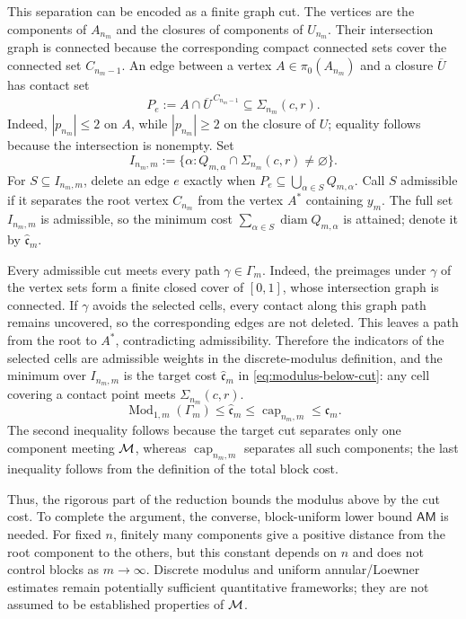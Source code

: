 This separation can be encoded as a finite graph cut. The vertices are
the components of \(A_{n_m}\) and the closures of components of
\(U_{n_m}\). Their intersection graph is connected because the
corresponding compact connected sets cover the connected set
\(C_{n_m-1}\). An edge between a vertex \(A\in\pi_0(A_{n_m})\) and a
closure \(\overline U\) has contact set
\[
 P_e:=A\cap\overline U^{\,C_{n_m-1}}\subseteq\Sigma_{n_m}(c,r).
\]
Indeed, \(|p_{n_m}|\le2\) on \(A\), while \(|p_{n_m}|\ge2\) on the
closure of \(U\); equality follows because the intersection is
nonempty. Set
\[
 I_{n_m,m}:=\{\alpha:Q_{m,\alpha}\cap\Sigma_{n_m}(c,r)\ne\varnothing\}.
\]
For \(S\subseteq I_{n_m,m}\), delete an edge \(e\) exactly when
\(P_e\subseteq\bigcup_{\alpha\in S}Q_{m,\alpha}\). Call \(S\)
admissible if it separates the root vertex \(C_{n_m}\) from the vertex
\(A^*\) containing \(y_m\). The full set \(I_{n_m,m}\) is admissible,
so the minimum cost
\(\sum_{\alpha\in S}\operatorname{diam}Q_{m,\alpha}\) is attained;
denote it by \(\widehat{\mathfrak c}_m\).

Every admissible cut meets every path \(\gamma\in\Gamma_m\). Indeed,
the preimages under \(\gamma\) of the vertex sets form a finite closed
cover of \([0,1]\), whose intersection graph is connected. If
\(\gamma\) avoids the selected cells, every contact along this graph
path remains uncovered, so the corresponding edges are not deleted.
This leaves a path from the root to \(A^*\), contradicting admissibility.
Therefore the indicators of the selected cells are admissible weights
in the discrete-modulus definition, and the minimum over \(I_{n_m,m}\)
is the target cost \(\widehat{\mathfrak c}_m\) in
\eqref{eq:modulus-below-cut}: any cell covering a contact point meets
\(\Sigma_{n_m}(c,r)\).
\begin{equation}
 \operatorname{Mod}_{1,m}(\Gamma_m)
 \le\widehat{\mathfrak c}_m
 \le\operatorname{cap}_{n_m,m}
 \le\mathfrak c_m.
 \label{eq:am-cut-reduction}
\end{equation}
The second inequality follows because the target cut separates only
one component meeting \(\mathcal M\), whereas \(\operatorname{cap}_{n_m,m}\)
separates all such components; the last inequality follows from the
definition of the total block cost.

Thus, the rigorous part of the reduction bounds the modulus above by
the cut cost. To complete the argument, the converse, block-uniform
lower bound \(\mathsf{AM}\) is needed. For fixed \(n\), finitely many
components give a positive distance from the root component to the
others, but this constant depends on \(n\) and does not control blocks
as \(m\to\infty\). Discrete modulus and uniform annular/Loewner
estimates remain potentially sufficient quantitative frameworks; they
are not assumed to be established properties of \(\mathcal M\).

